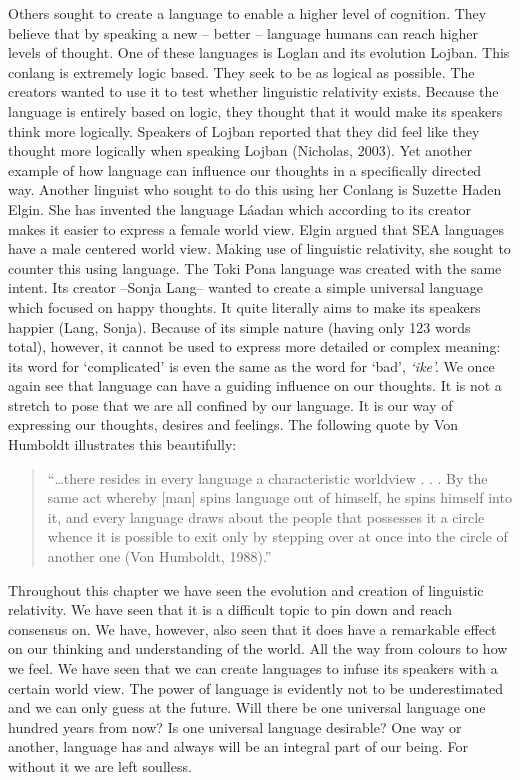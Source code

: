  
	Others sought to create a language to enable a higher level of cognition. They believe that by speaking a new – better – language humans can reach higher levels of thought. One of these languages is Loglan and its evolution Lojban. This conlang is extremely logic based. They seek to be as logical as possible. The creators wanted to use it to test whether linguistic relativity exists. Because the language is entirely based on logic, they thought that it would make its speakers think more logically. Speakers of Lojban reported that they did feel like they thought more logically when speaking Lojban (Nicholas, 2003). Yet another example of how language can influence our thoughts in a specifically directed way. Another linguist who sought to do this using her Conlang is Suzette Haden Elgin. She has invented the language Láadan which according to its creator makes it easier to express a female world view. Elgin argued that SEA languages have a male centered world view. Making use of linguistic relativity, she sought to counter this using language. The Toki Pona language was created with the same intent. Its creator –Sonja Lang– wanted to create a simple universal language which focused on happy thoughts. It quite literally aims to make its speakers happier (Lang, Sonja). Because of its simple nature (having only 123 words total), however, it cannot be used to express more detailed or complex meaning: its word for ‘complicated’ is even the same as the word for ‘bad’, \textit{‘ike’.} We once again see that language can have a guiding influence on our thoughts. It is not a stretch to pose that we are all confined by our language. It is our way of expressing our thoughts, desires and feelings. The following quote by Von Humboldt illustrates this beautifully: 

\begin{quote}
\begin{singlespace}
“…there resides in every language a characteristic worldview . . . By the same act whereby [man] spins language out of himself, he spins himself into it, and every language draws about the people that possesses it a circle whence it is possible to exit only by stepping over at once into the circle of another one (Von Humboldt, 1988).”
\end{singlespace}
\end{quote}

\noindent Throughout this chapter we have seen the evolution and creation of linguistic relativity. We have seen that it is a difficult topic to pin down and reach consensus on. We have, however, also seen that it does have a remarkable effect on our thinking and understanding of the world. All the way from colours to how we feel. We have seen that we can create languages to infuse its speakers with a certain world view. The power of language is evidently not to be underestimated and we can only guess at the future. Will there be one universal language one hundred years from now? Is one universal language desirable? One way or another, language has and always will be an integral part of our being. For without it we are left soulless.  

